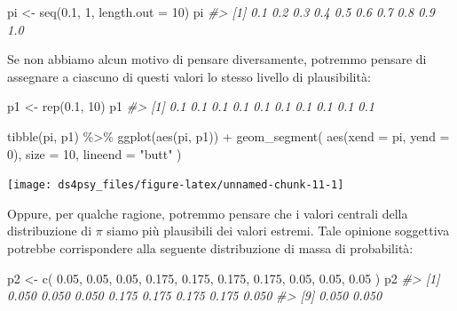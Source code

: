 \documentclass[
  11pt,
]{krantz}
\makeatletter
\newenvironment{Shaded}{\begin{snugshade}}{\end{snugshade}}
\newcommand{\AttributeTok}[1]{\textcolor[rgb]{0.61,0.61,0.61}{#1}}
\newcommand{\CommentTok}[1]{\textcolor[rgb]{0.37,0.37,0.37}{\textit{#1}}}
\newcommand{\DecValTok}[1]{\textcolor[rgb]{0.06,0.06,0.06}{#1}}
\newcommand{\FloatTok}[1]{\textcolor[rgb]{0.06,0.06,0.06}{#1}}
\newcommand{\FunctionTok}[1]{\textcolor[rgb]{0,0,0}{#1}}
\newcommand{\NormalTok}[1]{#1}
\newcommand{\OtherTok}[1]{\textcolor[rgb]{0.37,0.37,0.37}{#1}}
\newcommand{\SpecialCharTok}[1]{\textcolor[rgb]{0,0,0}{#1}}
\newcommand{\StringTok}[1]{\textcolor[rgb]{0.5,0.5,0.5}{#1}}
\newenvironment{kframe}{%
\medskip{}
\setlength{\fboxsep}{.8em}
 \def\at@end@of@kframe{}%
 \ifinner\ifhmode%
  \def\at@end@of@kframe{\end{minipage}}%
  \begin{minipage}{\columnwidth}%
 \fi\fi%
 \def\FrameCommand##1{\hskip\@totalleftmargin \hskip-\fboxsep
 \colorbox{shadecolor}{##1}\hskip-\fboxsep
     \hskip-\linewidth \hskip-\@totalleftmargin \hskip\columnwidth}%
 \MakeFramed {\advance\hsize-\width
   \@totalleftmargin\z@ \linewidth\hsize
   \@setminipage}}%
 {\par\unskip\endMakeFramed%
 \at@end@of@kframe}
\renewenvironment{Shaded}{\begin{kframe}}{\end{kframe}}
\theoremstyle{definition}
\theoremstyle{definition}
\theoremstyle{definition}
\theoremstyle{definition}
\theoremstyle{remark}
\makeatother
\begin{document}
\begin{Shaded}
\begin{Highlighting}[]
\NormalTok{pi }\OtherTok{\textless{}{-}} \FunctionTok{seq}\NormalTok{(}\FloatTok{0.1}\NormalTok{, }\DecValTok{1}\NormalTok{, }\AttributeTok{length.out =} \DecValTok{10}\NormalTok{)}
\NormalTok{pi}
\CommentTok{\#\textgreater{}  [1] 0.1 0.2 0.3 0.4 0.5 0.6 0.7 0.8 0.9 1.0}
\end{Highlighting}
\end{Shaded}

Se non abbiamo alcun motivo di pensare diversamente, potremmo pensare di assegnare a ciascuno di questi valori lo stesso livello di plausibilità:

\begin{Shaded}
\begin{Highlighting}[]
\NormalTok{p1 }\OtherTok{\textless{}{-}} \FunctionTok{rep}\NormalTok{(}\FloatTok{0.1}\NormalTok{, }\DecValTok{10}\NormalTok{)}
\NormalTok{p1}
\CommentTok{\#\textgreater{}  [1] 0.1 0.1 0.1 0.1 0.1 0.1 0.1 0.1 0.1 0.1}
\end{Highlighting}
\end{Shaded}

\begin{Shaded}
\begin{Highlighting}[]
\FunctionTok{tibble}\NormalTok{(pi, p1) }\SpecialCharTok{\%\textgreater{}\%}
  \FunctionTok{ggplot}\NormalTok{(}\FunctionTok{aes}\NormalTok{(pi, p1)) }\SpecialCharTok{+}
  \FunctionTok{geom\_segment}\NormalTok{(}
    \FunctionTok{aes}\NormalTok{(}\AttributeTok{xend =}\NormalTok{ pi, }\AttributeTok{yend =} \DecValTok{0}\NormalTok{),}
    \AttributeTok{size =} \DecValTok{10}\NormalTok{, }\AttributeTok{lineend =} \StringTok{"butt"}
\NormalTok{  )}
\end{Highlighting}
\end{Shaded}

\begin{center}\texttt{[image: ds4psy\_files/figure-latex/unnamed-chunk-11-1]} \end{center}

Oppure, per qualche ragione, potremmo pensare che i valori centrali della distribuzione di \(\pi\) siamo più plausibili dei valori estremi. Tale opinione soggettiva potrebbe corrispondere alla seguente distribuzione di massa di probabilità:

\begin{Shaded}
\begin{Highlighting}[]
\NormalTok{p2 }\OtherTok{\textless{}{-}} \FunctionTok{c}\NormalTok{(}
  \FloatTok{0.05}\NormalTok{, }\FloatTok{0.05}\NormalTok{, }\FloatTok{0.05}\NormalTok{, }\FloatTok{0.175}\NormalTok{, }\FloatTok{0.175}\NormalTok{, }\FloatTok{0.175}\NormalTok{, }\FloatTok{0.175}\NormalTok{, }\FloatTok{0.05}\NormalTok{, }\FloatTok{0.05}\NormalTok{, }\FloatTok{0.05}
\NormalTok{)}
\NormalTok{p2}
\CommentTok{\#\textgreater{}  [1] 0.050 0.050 0.050 0.175 0.175 0.175 0.175 0.050}
\CommentTok{\#\textgreater{}  [9] 0.050 0.050}
\end{Highlighting}
\end{Shaded}
\end{document}
